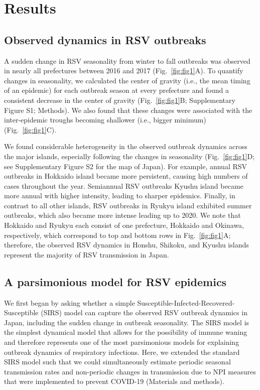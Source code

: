 \documentclass[12pt]{article}
\newcommand{\fref}[1]{Fig.~\ref{fig:#1}}
\begin{document}
\section*{Results}

\subsection*{Observed dynamics in RSV outbreaks}

A sudden change in RSV seasonality from winter to fall outbreaks was observed in nearly all prefectures between 2016 and 2017 (\fref{fig1}A).
To quantify changes in seasonality, we calculated the center of gravity (i.e., the mean timing of an epidemic) for each outbreak season at every prefecture and found a consistent decrease in the center of gravity (\fref{fig1}B; Supplementary Figure S1; Methods).
We also found that these changes were associated with the inter-epidemic troughs becoming shallower (i.e., bigger minimum) (\fref{fig1}C).

We found considerable heterogeneity in the observed outbreak dynamics across the major islands, especially following the changes in seasonality (\fref{fig1}D; see Supplementary Figure S2 for the map of Japan).
For example, annual RSV outbreaks in Hokkaido island became more persistent, causing high numbers of cases throughout the year.
Semiannual RSV outbreaks Kyushu island became more annual with higher intensity, leading to sharper epidemics.
Finally, in contrast to all other islands, RSV outbreaks in Ryukyu island exhibited summer outbreaks, which also became more intense leading up to 2020.
We note that Hokkaido and Ryukyu each consist of one prefecture, Hokkaido and Okinawa, respectively, 
which correspond to top and bottom rows in \fref{fig1}A;
therefore, the observed RSV dynamics in Honshu, Shikoku, and Kyushu islands represent the majority of RSV transmission in Japan.

\subsection*{A parsimonious model for RSV epidemics}

We first began by asking whether a simple Susceptible-Infected-Recovered-Susceptible (SIRS) model can capture the observed RSV outbreak dynamics in Japan, including the sudden change in outbreak seasonality.
The SIRS model is the simplest dynamical model that allows for the possibility of immune waning and therefore represents one of the most parsimonious models for explaining outbreak dynamics of respiratory infections.
Here, we extended the standard SIRS model such that we could simultaneously estimate periodic seasonal transmission rates and non-periodic changes in transmission due to NPI measures that were implemented to prevent COVID-19 (Materials and methods).
\end{document}
